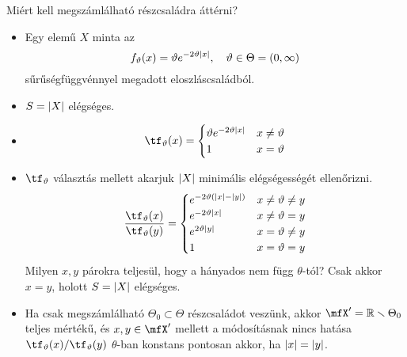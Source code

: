 \documentclass[aspectratio=169,notheorems,9pt,\option]{beamer}
\begin{document}
\begin{frame}{Miért kell megszámlálható részcsaládra áttérni?}
  \begin{itemize}
    \item Egy elemű $X$ minta  az 
    \begin{displaymath}
      f_\theta(x) = \theta e^{-2\theta \abs*{x}} ,\quad\theta\in\Theta=(0,\infty)
    \end{displaymath}
    sűrűségfüggvénnyel megadott eloszláscsaládból.
    \item $S=\abs*{X}$ elégséges.
    \item 
    \begin{displaymath}
      \tf_\theta(x)=\begin{cases}
        \theta e^{-2\theta \abs*{x}}& x\neq \theta\\
        1& x=\theta
      \end{cases}  
    \end{displaymath}
    \item $\tf_\theta$ választás mellett akarjuk $\abs*{X}$ minimális elégségességét ellenőrizni.
    \begin{displaymath}
      \frac{\tf_\theta(x)}{\tf_\theta(y)}=\begin{cases}
        e^{-2\theta(\abs*{x}-\abs*{y})} & x\neq\theta\neq y\\
        e^{-2\theta\abs*{x}} & x\neq\theta=y\\
        e^{2\theta\abs*{y}} &x=\theta\neq y\\
        1 & x=\theta=y
      \end{cases}
    \end{displaymath}
    Milyen $x,y$ párokra teljesül, hogy a hányados nem függ $\theta$-tól?
    Csak akkor $x=y$, holott $S=\abs*{X}$ elégséges.
    \item Ha csak megszámlálható $\Theta_0\subset \Theta$ részcsaládot veszünk, akkor 
    $\mfX'=\real\setminus\Theta_0$ teljes mértékű, és $x,y\in\mfX'$ mellett a módosításnak nincs hatása
    $\tf_\theta(x)/\tf_\theta(y)$ $\theta$-ban konstans pontosan akkor, ha $\abs*{x}=\abs*{y}$.
  \end{itemize}
  
\end{frame}
\end{document}
